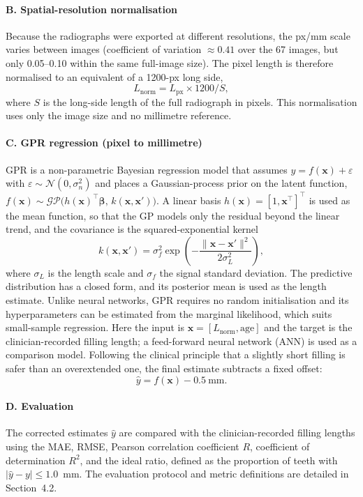 \paragraph{B. Spatial-resolution normalisation}
Because the radiographs were exported at different resolutions, the px/mm scale
varies between images (coefficient of variation $\approx0.41$ over the 67
images, but only 0.05--0.10 within the same full-image size). The pixel length is
therefore normalised to an equivalent of a 1200-px long side,
\begin{equation}
L_{\text{norm}} = L_{\text{px}} \times 1200 / S,
\label{eq:lnorm}
\end{equation}
where $S$ is the long-side length of the full radiograph in pixels. This
normalisation uses only the image size and no millimetre reference.

\paragraph{C. GPR regression (pixel to millimetre)}
GPR is a non-parametric Bayesian regression model that assumes
$y = f(\mathbf{x}) + \varepsilon$ with $\varepsilon\sim\mathcal{N}(0,\sigma_n^2)$
and places a Gaussian-process prior on the latent function,
$f(\mathbf{x}) \sim \mathcal{GP}\big(h(\mathbf{x})^{\top}\boldsymbol{\beta},\,k(\mathbf{x},\mathbf{x}')\big)$.
A linear basis $h(\mathbf{x}) = [1,\mathbf{x}^{\top}]^{\top}$ is used as the mean
function, so that the GP models only the residual beyond the linear trend, and
the covariance is the squared-exponential kernel
\begin{equation}
k(\mathbf{x},\mathbf{x}') = \sigma_f^2 \exp\!\left(-\frac{\lVert\mathbf{x}-\mathbf{x}'\rVert^2}{2\sigma_L^2}\right),
\label{eq:se}
\end{equation}
where $\sigma_L$ is the length scale and $\sigma_f$ the signal standard deviation.
The predictive distribution has a closed form, and its posterior mean is used as
the length estimate. Unlike neural networks, GPR requires no random
initialisation and its hyperparameters can be estimated from the marginal
likelihood, which suits small-sample regression. Here the input is
$\mathbf{x} = [L_{\text{norm}}, \text{age}]$ and the target is the
clinician-recorded filling length; a feed-forward neural network (ANN) is used as
a comparison model. Following the clinical principle that a slightly short
filling is safer than an overextended one, the final estimate subtracts a fixed
offset:
\begin{equation}
\hat{y} = f(\mathbf{x}) - 0.5~\text{mm}.
\label{eq:offset}
\end{equation}

\paragraph{D. Evaluation}
The corrected estimates $\hat{y}$ are compared with the clinician-recorded
filling lengths using the MAE, RMSE, Pearson correlation coefficient $R$,
coefficient of determination $R^2$, and the ideal ratio, defined as the
proportion of teeth with $|\hat{y}-y|\le 1.0$~mm. The evaluation protocol and
metric definitions are detailed in Section~4.2.
